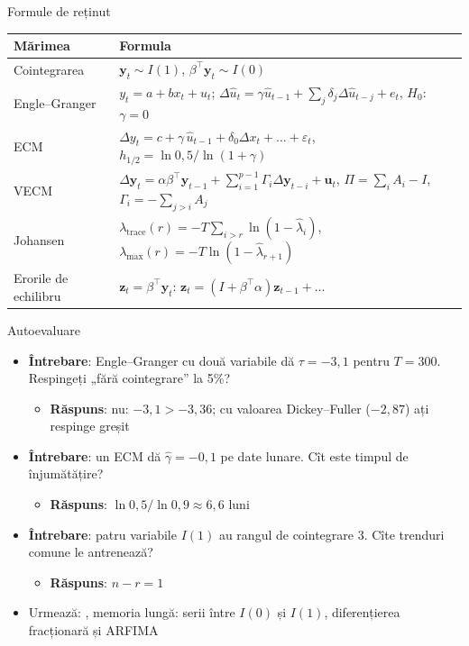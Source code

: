 \begin{frame}{Formule de reținut}
\itemsize{\small}
{\renewcommand{\arraystretch}{1.4}\begin{center}
\footnotesize
\begin{tabular}{ll}
\toprule
\textbf{Mărimea} & \textbf{Formula} \\
\midrule
Cointegrarea & $\mathbf y_t \sim I(1)$, \quad $\beta^\top\mathbf y_t \sim I(0)$ \\
Engle--Granger & $y_t = a + b x_t + u_t$; \quad $\Delta\hat u_t = \gamma\hat u_{t-1} + \sum_j\delta_j\Delta\hat u_{t-j} + e_t$, \quad $H_0$: $\gamma = 0$ \\
ECM & $\Delta y_t = c + \gamma\,\hat u_{t-1} + \delta_0\Delta x_t + \dots + \varepsilon_t$, \quad $h_{1/2} = \ln 0{,}5/\ln(1 + \gamma)$ \\
VECM & $\Delta\mathbf y_t = \alpha\beta^\top\mathbf y_{t-1} + \sum_{i=1}^{p-1}\Gamma_i\Delta\mathbf y_{t-i} + \mathbf u_t$, \quad $\Pi = \sum_i A_i - I$, \quad $\Gamma_i = -\sum_{j>i}A_j$ \\
Johansen & $\lambda_{\mathrm{trace}}(r) = -T\sum_{i>r}\ln(1 - \hat\lambda_i)$, \quad $\lambda_{\max}(r) = -T\ln(1 - \hat\lambda_{r+1})$ \\
Erorile de echilibru & $\mathbf z_t = \beta^\top\mathbf y_t$: \quad $\mathbf z_t = (I + \beta^\top\alpha)\mathbf z_{t-1} + \dots$ \\
\bottomrule
\end{tabular}
\end{center}
}
\end{frame}

\begin{frame}{Autoevaluare}
\itemsize{\small}
\begin{itemize}
    \item \textbf{Întrebare}: Engle--Granger cu două variabile dă $\tau = -3{,}1$ pentru $T = 300$. Respingeți „fără cointegrare” la 5\%?
    \begin{itemize}
        \item \textbf{Răspuns}: nu: $-3{,}1 > -3{,}36$; cu valoarea Dickey--Fuller ($-2{,}87$) ați respinge greșit
    \end{itemize}
    \item \textbf{Întrebare}: un ECM dă $\hat\gamma = -0{,}1$ pe date lunare. Cît este timpul de înjumătățire?
    \begin{itemize}
        \item \textbf{Răspuns}: $\ln 0{,}5/\ln 0{,}9 \approx 6{,}6$ luni
    \end{itemize}
    \item \textbf{Întrebare}: patru variabile $I(1)$ au rangul de cointegrare 3. Cîte trenduri comune le antrenează?
    \begin{itemize}
        \item \textbf{Răspuns}: $n - r = 1$
    \end{itemize}
    \item Urmează: , memoria lungă: serii între $I(0)$ și $I(1)$, diferențierea fracționară și ARFIMA
\end{itemize}
\end{frame}



